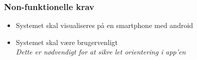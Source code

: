 \subsubsection{Non-funktionelle krav}

\begin{itemize}
\item Systemet skal visualiseres på en smartphone med android 
\item Systemet skal være brugervenligt
	\\
	\textit{Dette er nødvendigt for at sikre let orientering i app'en}
\end{itemize}



%
%

